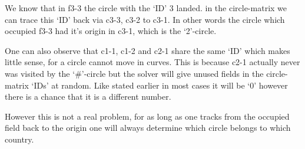 We know that in f3-3 the circle with the `ID' 3 landed. in the circle-matrix we can trace this `ID' back via c3-3, c3-2 to c3-1. In other words the circle which occupied f3-3 had it's origin in c3-1, which is the `2'-circle.

One can also observe that c1-1, c1-2 and c2-1 share the same `ID' which makes little sense, for a circle cannot move in curves. This is because c2-1 actually never was visited by the `\#'-circle but the solver will give unused fields in the circle-matrix `IDs' at random. Like stated earlier in most cases it will be `0' however there is a chance that it is a different number.

However this is not a real problem, for as long as one tracks from the occupied field back to the origin one will always determine which circle belongs to which country.

